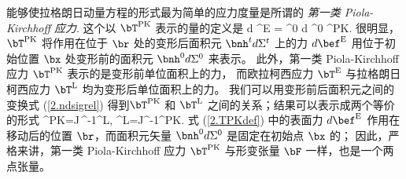 能够使拉格朗日动量方程的形式最为简单的应力度量是所谓的 {\em 第一类 Piola-Kirchhoff 应力}.
%
%
这个以
$\bT^{\rm PK}$ 表示的量的定义是
\eq
\label{2.TPKdef}
d\/ \bef^{\rm E} = \bnh^0 d\/ \Sigma^0 \cdot \bT^{\rm PK}.
\en
很明显， $\bT^{\rm PK}$ 将作用在位于 $\br$ 处的变形后面积元 
$\bnh^td\/\Sigma^t$ 上的力 $d\/ \bef^{\rm E}$
用位于初始位置 $\bx$ 处变形前的面积元 
$\bnh^0d\/\Sigma^0$ 来表示。
此外，第一类
Piola-Kirchhoff 应力 $\bT^{\rm PK}$ 表示的是变形前单位面积上的力，
而欧拉柯西应力 $\bT^{\rm E}$ 与拉格朗日柯西应力 $\bT^{\rm L}$ 均为变形后单位面积上的力。
我们可以用变形前后面积元之间的变换式 (\ref{2.ndsigrel}) 得到$\bT^{\rm PK}$ 和 $\bT^{\rm L}$
之间的关系；结果可以表示成两个等价的形式
\eq
\label{2.tpkt1}
\bT^{\rm PK}=J\,\bF^{-1}\cdot\bT^{\rm L},\qquad
\bT^{\rm L}=J^{-1}\bF\cdot\bT^{\rm PK}.
\en
式 (\ref{2.TPKdef}) 中的表面力 $d\/\bef^{\rm E}$ 
%
%
作用在移动后的位置 $\br$，而面积元矢量
$\bnh^0d\/\Sigma^0$ 是固定在初始点 $\bx$ 的；
因此，严格来讲，第一类 Piola-Kirchhoff 应力 $\bT^{\rm PK}$ 与形变张量 $\bF$ 一样，也是一个两点张量。
%
%

